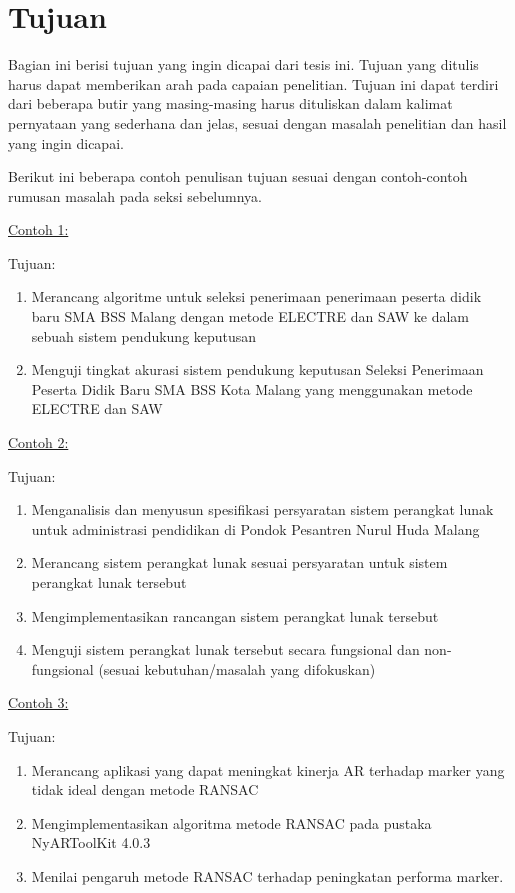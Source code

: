\section{Tujuan}

Bagian ini berisi tujuan yang ingin dicapai dari tesis ini. Tujuan yang ditulis harus dapat memberikan arah pada capaian penelitian. Tujuan ini dapat terdiri dari beberapa butir yang masing-masing harus dituliskan dalam kalimat pernyataan yang sederhana dan jelas, sesuai dengan masalah penelitian dan hasil yang ingin dicapai. 

Berikut ini beberapa contoh penulisan tujuan sesuai dengan contoh-contoh rumusan masalah pada seksi sebelumnya.

\noindent\underline{Contoh 1:}

\noindent Tujuan:
\begin{enumerate}
  \item Merancang algoritme untuk seleksi penerimaan penerimaan peserta didik baru SMA BSS Malang dengan metode ELECTRE dan SAW ke dalam sebuah sistem pendukung keputusan
  \item Menguji tingkat akurasi sistem pendukung keputusan Seleksi Penerimaan Peserta Didik Baru SMA BSS Kota Malang yang menggunakan metode ELECTRE dan SAW 
\end{enumerate}

\noindent\underline{Contoh 2:}

\noindent Tujuan:
\begin{enumerate}
  \item Menganalisis dan menyusun spesifikasi persyaratan sistem perangkat lunak untuk administrasi pendidikan di Pondok Pesantren Nurul Huda Malang
  \item Merancang sistem perangkat lunak sesuai persyaratan untuk sistem perangkat lunak tersebut
  \item Mengimplementasikan rancangan sistem perangkat lunak tersebut
  \item Menguji sistem perangkat lunak tersebut secara fungsional dan non-fungsional (sesuai kebutuhan/masalah yang difokuskan)
\end{enumerate}

\noindent\underline{Contoh 3:}

\noindent Tujuan:
\begin{enumerate}
  \item Merancang aplikasi yang dapat meningkat kinerja AR terhadap marker yang tidak ideal dengan metode RANSAC
  \item Mengimplementasikan algoritma metode RANSAC pada pustaka NyARToolKit 4.0.3
  \item Menilai pengaruh metode RANSAC terhadap peningkatan performa marker. 
\end{enumerate}

